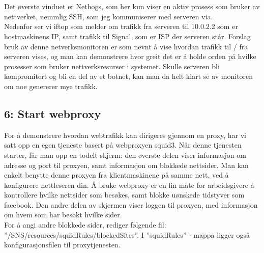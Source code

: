 \documentclass{article}
\begin{document}
\\ \\
Det øverste vinduet er Nethogs, som her kun viser en aktiv prosess som bruker av nettverket, nemmlig SSH, som jeg kommuniserer med serveren via. \\ 
Nedenfor ser vi iftop som melder om trafikk fra serveren til 10.0.2.2 som er hostmaskinens IP, samt trafikk til Signal, som er ISP der serveren står.
Forslag bruk av denne netverksmonitoren er som nevnt å vise hvordan trafikk til / fra serveren vises, og man kan demonstrere hvor greit det er å holde orden på hvilke prosesser som bruker nettverksresurser i systemet. Skulle serveren bli kompromitert og bli en del av et botnet, kan man da helt klart se av monitoren om noe genererer mye trafikk. 
\subsection{6: Start webproxy}
For å demonstrere hvordan webtrafikk kan dirigeres gjennom en proxy, har vi satt opp en egen tjeneste basert på webproxyen squid3. Når denne tjenesten starter, får man opp en todelt skjerm: den øverste delen viser informasjon om adresse og port til proxyen, samt informasjon om blokkede nettsider. Man kan enkelt benytte denne proxyen fra klientmaskinene på samme nett, ved å konfigurere nettleseren din. Å bruke webproxy er en fin måte for arbeidsgivere å kontrollere hvilke nettsider som besøkes, samt blokke uønskede tidstyver som facebook. Den andre delen av skjermen viser loggen til proxyen, med informasjon om hvem som har besøkt hvilke sider. \\
For å angi andre blokkede sider, rediger følgende fil: ''/SNS/resources/squidRules/blockedSites''. I ''squidRules'' - mappa ligger også konfigurasjonsfilen til proxytjenesten.
\\ \\
\end{document}
